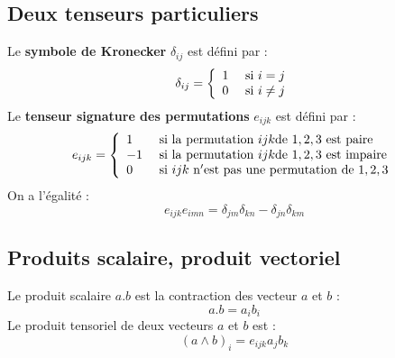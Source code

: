 \documentclass[12pt]{book}
\begin{document}
\subsection{Deux tenseurs particuliers}
Le {\bf symbole de Kronecker} $\delta_{ij}$ est d\'efini par :
\begin{equation}
\delta_{ij}=\left\{\begin{array}{ll}
 1& {\rm\ si\ }i=j\\
 0& {\rm\ si\ }i\neq j
\end{array}\right.
\end{equation}
Le {\bf tenseur signature des permutations} $e_{ijk}$ est d\'efini par :
\begin{equation}
e_{ijk}=\left\{\begin{array}{ll}
 1& {\rm\ si\ la\ permutation\ }ijk{\rm de\ }1,2,3{\rm \ est \ paire}\\
 -1&  {\rm\ si\ la\ permutation\ }ijk{\rm de\ }1,2,3{\rm \ est \ impaire}\\
0& {\rm\ si\ }ijk{\rm\ n'est\ pas\ une\ permutation\ de\ }1,2,3\\
\end{array}\right.
\end{equation}
On a l'\'egalit\'e :
\begin{equation}
e_{ijk}e_{imn}=\delta_{jm}\delta_{kn}-\delta_{jn}\delta_{km}
\end{equation}
\subsection{Produits scalaire, produit vectoriel}
Le produit scalaire $a.b$ est la contraction des vecteur $a$ et $b$ :
\begin{equation}
a.b=a_ib_i
\end{equation}
Le produit tensoriel de deux vecteurs $a$ et $b$ est :
\begin{equation}
(a\wedge b)_i=e_{ijk}a_jb_k
\end{equation}
\end{document}
